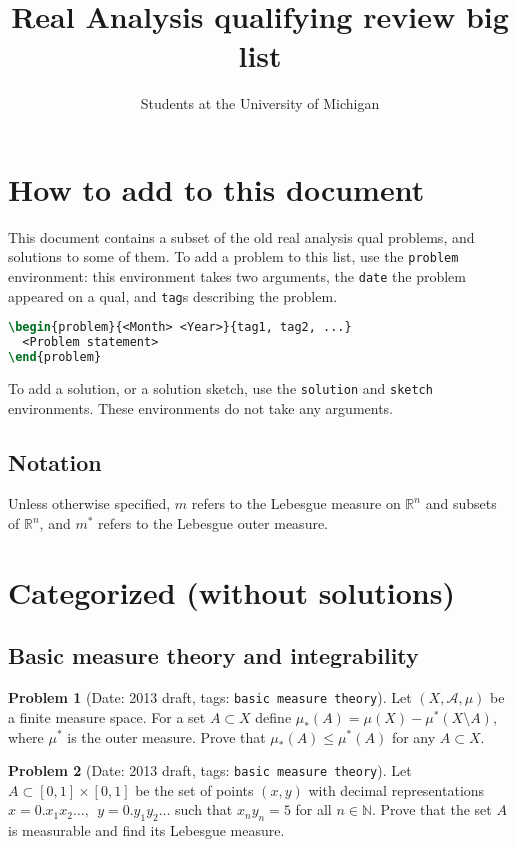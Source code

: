 \documentclass[11pt, notitlepage]{article}
\title{Real Analysis qualifying review big list}
\author{Students at the University of Michigan}
\theoremstyle{definition}
\theoremstyle{definition}
\theoremstyle{definition}
\newtheorem{probstate}{Problem}
\theoremstyle{remark}
\newenvironment{problem}[2]{
    \begin{probstate}[Date: #1, tags: \texttt{#2}]
}
{
  \end{probstate}
}
\newcommand{\N}{\mathbb{N}}
\begin{document}
\maketitle

\tableofcontents

\section*{How to add to this document}
This document contains a subset of the old real analysis qual problems, and solutions to some of them.
To add a problem to this list, use the \texttt{problem} environment: this environment takes two arguments, the \texttt{date} the problem appeared on a qual, and \texttt{tag}s describing the problem.
\begin{lstlisting}[language=TeX]
\begin{problem}{<Month> <Year>}{tag1, tag2, ...}
  <Problem statement>
\end{problem}
\end{lstlisting}

To add a solution, or a solution sketch, use the \texttt{solution} and \texttt{sketch} environments.
These environments do not take any arguments.

\subsection*{Notation}
Unless otherwise specified, $m$ refers to the Lebesgue measure on $\mathbb{R}^n$ and subsets of $\mathbb{R}^n$, and $m^{\ast}$ refers to the Lebesgue outer measure.

\section{Categorized (without solutions)}

\subsection{Basic measure theory and integrability}


\begin{problem}{2013 draft}{basic measure theory}
Let $(X, \mathcal{A},\mu)$ be a finite measure space. For a set $A \subset X$ define $\mu_*(A)=\mu(X)-\mu^*(X \setminus A)$, where $\mu^*$ is the outer measure. Prove that $\mu_*(A) \le \mu^*(A)$ for any $A \subset X$.
\end{problem}

\begin{problem}{2013 draft}{basic measure theory}
Let $A \subset [0,1] \times [0,1]$ be the set of points $(x,y)$ with decimal representations $x=0.x_1 x_2 \ldots, \ \  y=0.y_1 y_2 \ldots$ such that  $x_n y_n=5$ for all $n \in \N$. Prove that the set $A$ is measurable and find its Lebesgue measure.
\end{problem}
\end{document}
